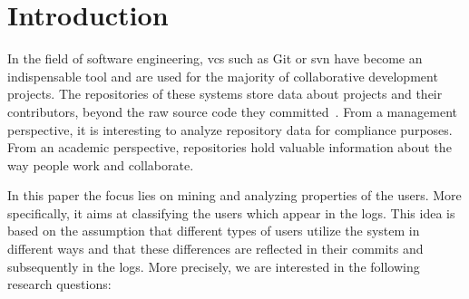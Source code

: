 \section{Introduction}\label{sec:introduction}

In the field of software engineering, \gls{vcs} such as Git or \gls{svn} have become an indispensable tool and are used for the majority of collaborative development projects. The repositories of these systems store data about projects and their contributors, beyond the raw source code they committed~\citep{Yu.LiguoRamaswamy.2007}.
From a management perspective, it is interesting to analyze repository data for compliance purposes. From an academic perspective, repositories hold valuable information about the way people work and collaborate.


In this paper the focus lies on mining and analyzing properties of the users. More specifically, it aims at classifying the users which appear in the logs. This idea is based on the assumption that different types of users utilize the system in different ways and that these differences are reflected in their commits and subsequently in the logs. More precisely, we are interested in the following research questions:


